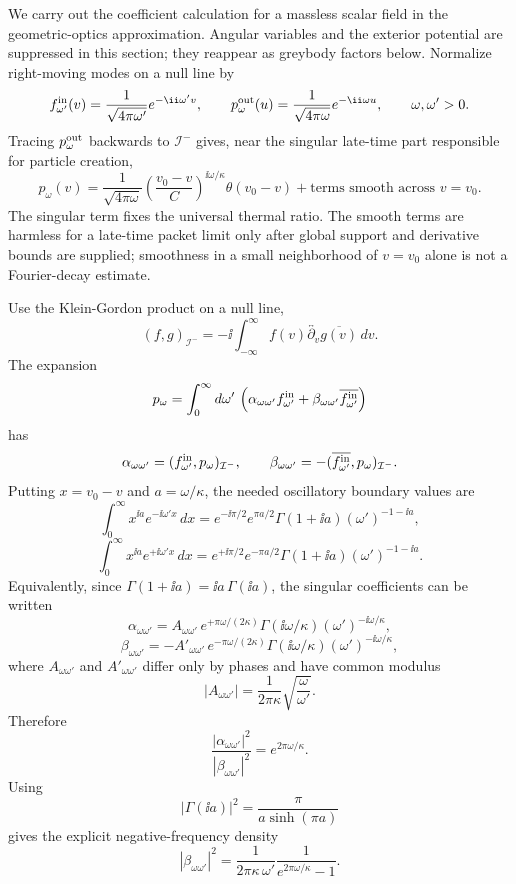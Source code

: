 We carry out the coefficient calculation for a massless scalar field in the
geometric-optics approximation.  Angular variables and the exterior
potential are suppressed in this section; they reappear as greybody factors
below.  Normalize right-moving modes on a null line by
\[
  f_{\omega'}^{\rm in}(v)
  =
  \frac{1}{\sqrt{4\pi\omega'}}e^{-\ii\omega' v},
  \qquad
  p_{\omega}^{\rm out}(u)
  =
  \frac{1}{\sqrt{4\pi\omega}}e^{-\ii\omega u},
  \qquad
  \omega,\omega'>0 .
\]
Tracing \(p_\omega^{\rm out}\) backwards to \(\mathcal I^-\) gives, near the
singular late-time part responsible for particle creation,
\begin{equation}
  p_\omega(v)
  =
  \frac{1}{\sqrt{4\pi\omega}}
  \left(\frac{v_0-v}{C}\right)^{\ii\omega/\kappa}
  \theta(v_0-v)
  +\text{terms smooth across }v=v_0 .
  \label{eq:hawking-traced-mode-singular-part}
\end{equation}
The singular term fixes the universal thermal ratio.  The smooth terms are
harmless for a late-time packet limit only after global support and derivative
bounds are supplied; smoothness in a small neighborhood of \(v=v_0\) alone is
not a Fourier-decay estimate.

Use the Klein-Gordon product on a null line,
\[
  (f,g)_{\mathcal I^-}
  =
  -\ii\int_{-\infty}^{\infty}
  f(v)\overleftrightarrow{\partial_v}\overline{g(v)}\,dv .
\]
The expansion
\[
  p_\omega
  =
  \int_0^\infty d\omega'\,
  \left(
  \alpha_{\omega\omega'}f_{\omega'}^{\rm in}
  +
  \beta_{\omega\omega'}\overline{f_{\omega'}^{\rm in}}
  \right)
\]
has
\[
  \alpha_{\omega\omega'}=(f_{\omega'}^{\rm in},p_\omega)_{\mathcal I^-},
  \qquad
  \beta_{\omega\omega'}=-(\overline{f_{\omega'}^{\rm in}},p_\omega)_{\mathcal I^-}.
\]
Putting \(x=v_0-v\) and \(a=\omega/\kappa\), the needed oscillatory boundary
values are
\[
  \int_0^\infty x^{\ii a}e^{-\ii\omega' x}\,dx
  =
  e^{-\ii\pi/2}e^{\pi a/2}\Gamma(1+\ii a)(\omega')^{-1-\ii a},
\]
\[
  \int_0^\infty x^{\ii a}e^{+\ii\omega' x}\,dx
  =
  e^{+\ii\pi/2}e^{-\pi a/2}\Gamma(1+\ii a)(\omega')^{-1-\ii a}.
\]
Equivalently, since \(\Gamma(1+\ii a)=\ii a\,\Gamma(\ii a)\), the singular
coefficients can be written
\[
  \alpha_{\omega\omega'}
  =
  A_{\omega\omega'}\,e^{+\pi\omega/(2\kappa)}
  \Gamma(\ii\omega/\kappa)(\omega')^{-\ii\omega/\kappa},
\]
\[
  \beta_{\omega\omega'}
  =
  -A'_{\omega\omega'}\,e^{-\pi\omega/(2\kappa)}
  \Gamma(\ii\omega/\kappa)(\omega')^{-\ii\omega/\kappa},
\]
where \(A_{\omega\omega'}\) and \(A'_{\omega\omega'}\) differ only by phases
and have common modulus
\[
  |A_{\omega\omega'}|
  =
  \frac{1}{2\pi\kappa}\sqrt{\frac{\omega}{\omega'}} .
\]
Therefore
\[
  \frac{|\alpha_{\omega\omega'}|^2}{|\beta_{\omega\omega'}|^2}
  =
  e^{2\pi\omega/\kappa}.
\]
Using
\[
  |\Gamma(\ii a)|^2=\frac{\pi}{a\sinh(\pi a)}
\]
gives the explicit negative-frequency density
\begin{equation}
  |\beta_{\omega\omega'}|^2
  =
  \frac{1}{2\pi\kappa\,\omega'}
  \frac{1}{e^{2\pi\omega/\kappa}-1}.
  \label{eq:hawking-continuum-beta-density}
\end{equation}


